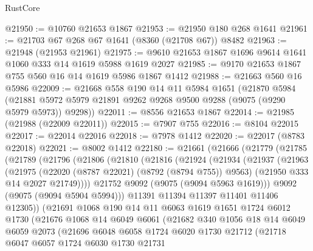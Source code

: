 \begin{lexlean}{RustCore}
\begin{coremodule}
@21950 := @10760 @21653 @1867
@21953 := @21950 @180 @268 @1641
@21961 := @21703 @67 @268 @67 @1641 (@8360 (@21708 @67)) @8482
@21963 := @21948 (@21953 @21961)
@21975 := @9610 @21653 @1867 @1696 @9614 @1641 @1060 @333 @14 @1619 @5988 @1619 @2027
@21985 := @9170 @21653 @1867 @755 @560 @16 @14 @1619 @5986 @1867 @1412
@21988 := @21663 @560 @16 @5986
@22009 := @21668
    @558
    @190
    @14
    @11
    @5984
    @1651
    (@21870
      @5984
      (@21881 @5972 @5979 @21891 @9262 @9268 @9500 @9288 (@9075 (@9290 @5979 @5973)) @9298))
@22011 := @8556 @21653 @1867
@22014 := @21985 (@21988 (@22009 @22011))
@22015 := @7907 @755
@22016 := @8104 @22015
@22017 := @22014 @22016
@22018 := @7978 @1412
@22020 := @22017 (@8783 @22018)
@22021 := @8002 @1412
@22180 := @21661
    (@21666
      (@21779
        (@21785
          (@21789
            (@21796
              (@21806
                (@21810
                  (@21816
                    (@21924
                      (@21934
                        (@21937
                          (@21963
                            (@21975
                              (@22020 (@8787 @22021) (@8792 (@8794 @755)) @9563)
                              (@21950 @333 @14 @2027 @21749))))
                        @21752
                        @9092
                        (@9075 (@9094 @5963 @1619)))
                      @9092
                      (@9075 (@9094 @5904 @5994)))
                    @11391
                    @11394
                    @11397
                    @11401
                    @11406
                    @12305))
                (@21691
                  @1068
                  @190
                  @14
                  @11
                  @6063
                  @1619
                  @1651
                  @1724
                  @6012
                  @1730
                  (@21676
                    @1068
                    @14
                    @6049
                    @6061
                    (@21682
                      @340
                      @1056
                      @18
                      @14
                      @6049
                      @6059
                      @2073
                      (@21696
                        @6048
                        @6058
                        @1724
                        @6020
                        @1730
                        @21712
                        (@21718
                          @6047
                          @6057
                          @1724
                          @6030
                          @1730
                          @21731

\end{coremodule}
\end{lexlean}
